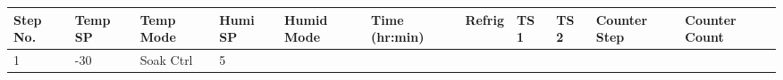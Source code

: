 \begin{longtable}[]{@{}lllllllllll@{}}
\toprule
\begin{minipage}[b]{0.08\columnwidth}\raggedright
Step No.\strut
\end{minipage} & \begin{minipage}[b]{0.07\columnwidth}\raggedright
Temp SP\strut
\end{minipage} & \begin{minipage}[b]{0.09\columnwidth}\raggedright
Temp Mode\strut
\end{minipage} & \begin{minipage}[b]{0.06\columnwidth}\raggedright
Humi SP\strut
\end{minipage} & \begin{minipage}[b]{0.06\columnwidth}\raggedright
Humid Mode\strut
\end{minipage} & \begin{minipage}[b]{0.12\columnwidth}\raggedright
Time (hr:min)\strut
\end{minipage} & \begin{minipage}[b]{0.07\columnwidth}\raggedright
Refrig\strut
\end{minipage} & \begin{minipage}[b]{0.04\columnwidth}\raggedright
TS 1\strut
\end{minipage} & \begin{minipage}[b]{0.05\columnwidth}\raggedright
TS 2\strut
\end{minipage} & \begin{minipage}[b]{0.03\columnwidth}\raggedright
Counter Step\strut
\end{minipage} & \begin{minipage}[b]{0.03\columnwidth}\raggedright
Counter Count\strut
\end{minipage}\tabularnewline
\midrule
\endhead
\begin{minipage}[t]{0.08\columnwidth}\raggedright
1\strut
\end{minipage} & \begin{minipage}[t]{0.07\columnwidth}\raggedright
-30\strut
\end{minipage} & \begin{minipage}[t]{0.09\columnwidth}\raggedright
Soak Ctrl\strut
\end{minipage} & \begin{minipage}[t]{0.06\columnwidth}\raggedright
5\strut
\end{minipage} & \begin{minipage}[t]{0.06\columnwidth}\raggedright

\end{minipage}
\end{longtable}
